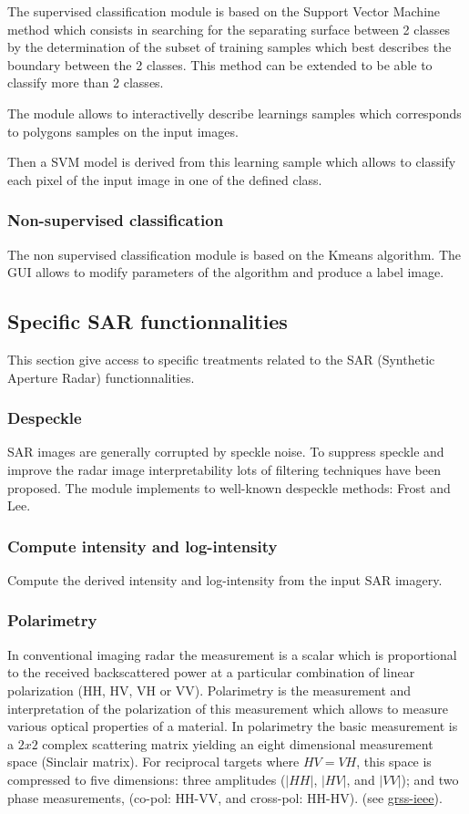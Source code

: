 The supervised classification module is based on the Support Vector
Machine method which consists in searching for the separating surface
between 2 classes by the determination of the subset of training
samples which best describes the boundary between the 2 classes. This
method can be extended to be able to classify more than 2 classes.

The module allows to interactivelly describe learnings samples which
corresponds to polygons samples on the input images.

Then a SVM model is derived from this learning sample which allows to
classify each pixel of the input image in one of the defined class.


\subsubsection{Non-supervised classification}
The non supervised classification module is based on the Kmeans
algorithm.  The GUI allows to modify parameters of the algorithm and
produce a label image.

\subsection{Specific SAR functionnalities}
This section give access to specific treatments related to the SAR
(Synthetic Aperture Radar) functionnalities.

\subsubsection{Despeckle}
SAR images are generally corrupted by speckle noise. To suppress 
speckle and improve the radar image interpretability lots of filtering 
techniques have been proposed.  The module implements to well-known 
despeckle methods: Frost and Lee.

\subsubsection{Compute intensity and log-intensity}
Compute the derived intensity and log-intensity from the input SAR imagery.

\subsubsection{Polarimetry}
In conventional imaging radar the measurement is a scalar which is 
proportional to the received backscattered power at a particular combination 
of linear polarization (HH, HV, VH or VV). 
Polarimetry is the measurement and interpretation of the polarization of this measurement which
allows to measure various optical properties of a material.
In polarimetry the basic measurement is a $2x2$ complex scattering
matrix yielding an eight dimensional measurement space (Sinclair
matrix). For reciprocal targets where $HV=VH$, this space is
compressed to five dimensions: three amplitudes ($|HH|$, $|HV|$, and
$|VV|$); and two phase measurements, (co-pol: HH-VV, and cross-pol:
HH-HV). (see 
\href{http://www.grss-ieee.org/technical-briefs/imaging-radar-polarimetry}{grss-ieee}).
 
